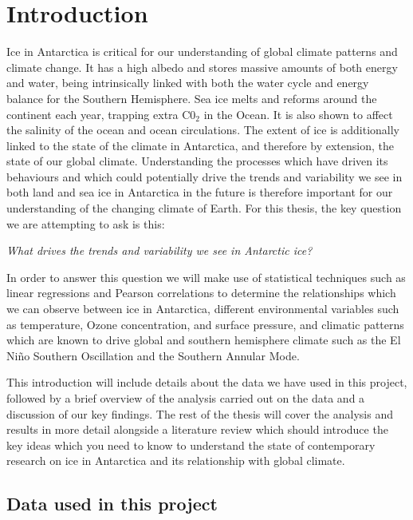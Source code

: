 \documentclass[../main.tex]{subfiles}
\begin{document}
\chapter{Introduction}

Ice in Antarctica is critical for our understanding of global climate patterns and climate change. It has a high albedo and stores massive amounts of both energy and water, being intrinsically linked with both the water cycle and energy balance for the Southern Hemisphere. Sea ice melts and reforms around the continent each year, trapping extra C0$_2$ in the Ocean. It is also shown to affect the salinity of the ocean and ocean circulations. 
The extent of ice is additionally linked to the state of the climate in Antarctica, and therefore by extension, the state of our global climate. Understanding the processes which have driven its behaviours and which could potentially drive the trends and variability we see in both land and sea ice in Antarctica in the future is therefore important for our understanding of the changing climate of Earth.
For this thesis, the key question we are attempting to ask is this:
\medskip 

\begin{tcolorbox}[colback=white!98!black,colframe=gray!60!blue]
\centering
	\textit{What drives the trends and variability we see in Antarctic ice?}
\end{tcolorbox}

In order to answer this question we will make use of statistical techniques such as linear regressions and Pearson correlations to determine the relationships which we can observe between ice in Antarctica, different environmental variables such as temperature, Ozone concentration, and surface pressure, and climatic patterns which are known to drive global and southern hemisphere climate such as the El Ni\~no Southern Oscillation and the Southern Annular Mode.

This introduction will include details about the data we have used in this project, followed by a brief overview of the analysis carried out on the data and a discussion of our key findings. The rest of the thesis will cover the analysis and results in more detail alongside a literature review which should introduce the key ideas which you need to know to understand the state of contemporary research on ice in Antarctica and its relationship with global climate.


\section{Data used in this project}
\end{document}
